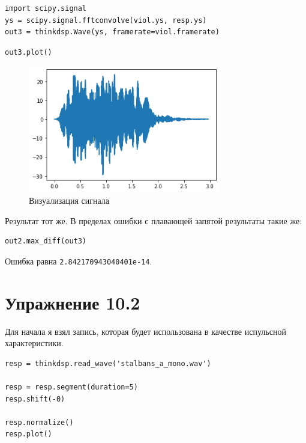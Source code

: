 \documentclass[a4paper,12pt]{report}
\begin{document}
\begin{lstlisting}[caption=Изменение сигнала]
import scipy.signal
ys = scipy.signal.fftconvolve(viol.ys, resp.ys)
out3 = thinkdsp.Wave(ys, framerate=viol.framerate)
\end{lstlisting}

\begin{lstlisting}[caption=Визуализация сигнала]
out3.plot()
\end{lstlisting}

\begin{figure}[H]
        \centering
        \includegraphics[width=0.75\textwidth]{8.png}
        \caption{Визуализация сигнала}
        \label{8}
\end{figure}

Результат тот же. В пределах ошибки с плавающей запятой результаты такие же:

\begin{lstlisting}[caption=Сравнение результатов]
out2.max_diff(out3)
\end{lstlisting}

Ошибка равна \texttt{2.842170943040401e-14}.

\chapter{Упражнение 10.2}

Для начала я взял запись, которая будет использована в качестве испульсной характеристики.

\begin{lstlisting}[caption=Загрузка звука]
resp = thinkdsp.read_wave('stalbans_a_mono.wav')

resp = resp.segment(duration=5)
resp.shift(-0)

resp.normalize()
resp.plot()
\end{lstlisting}
\end{document}
